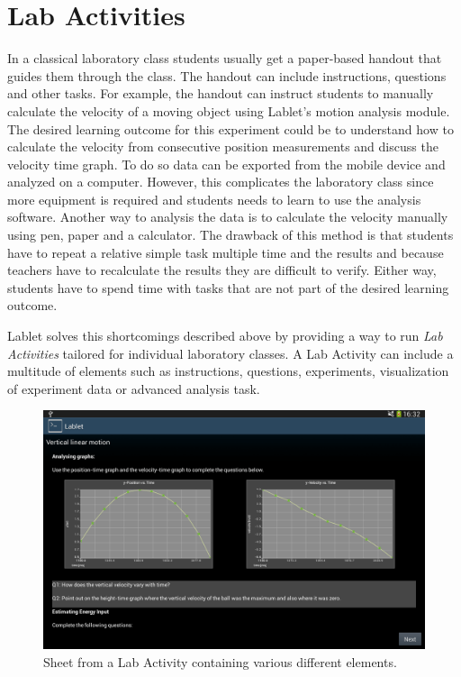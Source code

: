 \documentclass{sigchi}
\begin{document}
\section{Lab Activities}
In a classical laboratory class students usually get a paper-based
handout that guides them through the class.  The handout can include
instructions, questions and other tasks.  For example, the handout can
instruct students to manually calculate the velocity of a moving
object using Lablet's motion analysis module.  The desired learning
outcome for this experiment could be to understand how to calculate
the velocity from consecutive position measurements and discuss the
velocity time graph.  To do so data can be exported from the mobile
device and analyzed on a computer.  However, this complicates the
laboratory class since more equipment is required and students needs
to learn to use the analysis software.  Another way to analysis the
data is to calculate the velocity manually using pen, paper and a
calculator.  The drawback of this method is that students have to
repeat a relative simple task multiple time and the results and
because teachers have to recalculate the results they are difficult to
verify.  Either way, students have to spend time with tasks that are
not part of the desired learning outcome.

Lablet solves this shortcomings described above by providing a way to
run {\em Lab Activities} tailored for individual laboratory classes.
A Lab Activity can include a multitude of elements such as
instructions, questions, experiments, visualization of experiment
data or advanced analysis task.

\begin{figure}
  \centering
  \includegraphics[width=.99\columnwidth]{LabActivitySheet}
  \caption{Sheet from a Lab Activity containing various different
    elements.}
  \label{fig:LabActivitySheet} 
\end{figure}
\end{document}
